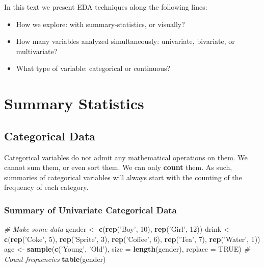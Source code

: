 \documentclass[]{book}
\newenvironment{Shaded}{\begin{snugshade}}{\end{snugshade}}
\newcommand{\KeywordTok}[1]{\textcolor[rgb]{0.13,0.29,0.53}{\textbf{#1}}}
\newcommand{\DataTypeTok}[1]{\textcolor[rgb]{0.13,0.29,0.53}{#1}}
\newcommand{\DecValTok}[1]{\textcolor[rgb]{0.00,0.00,0.81}{#1}}
\newcommand{\StringTok}[1]{\textcolor[rgb]{0.31,0.60,0.02}{#1}}
\newcommand{\CommentTok}[1]{\textcolor[rgb]{0.56,0.35,0.01}{\textit{#1}}}
\newcommand{\OtherTok}[1]{\textcolor[rgb]{0.56,0.35,0.01}{#1}}
\newcommand{\NormalTok}[1]{#1}
\providecommand{\tightlist}{%
  \setlength{\itemsep}{0pt}\setlength{\parskip}{0pt}}
\theoremstyle{definition}
\theoremstyle{definition}
\theoremstyle{definition}
\theoremstyle{remark}
\begin{document}
In this text we present EDA techniques along the following lines:

\begin{itemize}
\tightlist
\item
  How we explore: with summary-statistics, or visually?
\item
  How many variables analyzed simultaneously: univariate, bivariate, or
  multivariate?
\item
  What type of variable: categorical or continuous?
\end{itemize}

\section{Summary Statistics}\label{summary-statistics}

\subsection{Categorical Data}\label{categorical-data}

Categorical variables do not admit any mathematical operations on them.
We cannot sum them, or even sort them. We can only \textbf{count} them.
As such, summaries of categorical variables will always start with the
counting of the frequency of each category.

\subsubsection{Summary of Univariate Categorical
Data}\label{summary-of-univariate-categorical-data}

\begin{Shaded}
\begin{Highlighting}[]
\CommentTok{# Make some data}
\NormalTok{gender <-}\StringTok{ }\KeywordTok{c}\NormalTok{(}\KeywordTok{rep}\NormalTok{(}\StringTok{'Boy'}\NormalTok{, }\DecValTok{10}\NormalTok{), }\KeywordTok{rep}\NormalTok{(}\StringTok{'Girl'}\NormalTok{, }\DecValTok{12}\NormalTok{))}
\NormalTok{drink <-}\StringTok{ }\KeywordTok{c}\NormalTok{(}\KeywordTok{rep}\NormalTok{(}\StringTok{'Coke'}\NormalTok{, }\DecValTok{5}\NormalTok{), }\KeywordTok{rep}\NormalTok{(}\StringTok{'Sprite'}\NormalTok{, }\DecValTok{3}\NormalTok{), }\KeywordTok{rep}\NormalTok{(}\StringTok{'Coffee'}\NormalTok{, }\DecValTok{6}\NormalTok{), }\KeywordTok{rep}\NormalTok{(}\StringTok{'Tea'}\NormalTok{, }\DecValTok{7}\NormalTok{), }\KeywordTok{rep}\NormalTok{(}\StringTok{'Water'}\NormalTok{, }\DecValTok{1}\NormalTok{))  }
\NormalTok{age <-}\StringTok{  }\KeywordTok{sample}\NormalTok{(}\KeywordTok{c}\NormalTok{(}\StringTok{'Young'}\NormalTok{, }\StringTok{'Old'}\NormalTok{), }\DataTypeTok{size =} \KeywordTok{length}\NormalTok{(gender), }\DataTypeTok{replace =} \OtherTok{TRUE}\NormalTok{)}
\CommentTok{# Count frequencies}
\KeywordTok{table}\NormalTok{(gender)}
\end{Highlighting}
\end{Shaded}
\end{document}
